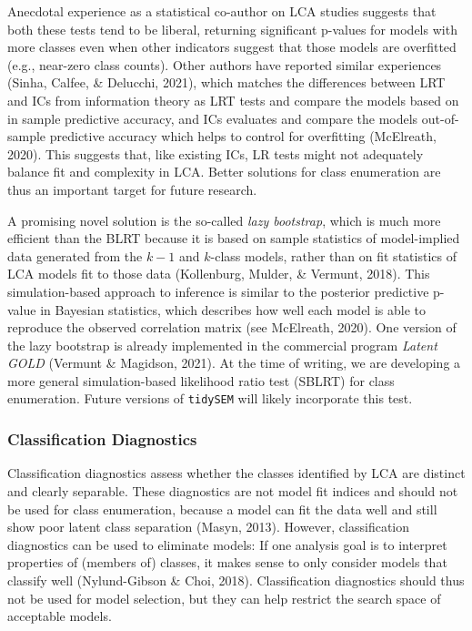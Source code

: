 \documentclass[
  ,man,floatsintext]{apa6}
\begin{document}
Anecdotal experience as a statistical co-author on LCA studies suggests that both these tests tend to be liberal,
returning significant p-values for models with more classes even when other indicators suggest that those models are overfitted (e.g., near-zero class counts).
Other authors have reported similar experiences (Sinha, Calfee, \& Delucchi, 2021), which matches the differences between LRT and ICs from information theory as LRT tests and compare the models based on in sample predictive accuracy, and ICs evaluates and compare the models out-of-sample predictive accuracy which helps to control for overfitting (McElreath, 2020).
This suggests that, like existing ICs,
LR tests might not adequately balance fit and complexity in LCA.
Better solutions for class enumeration are thus an important target for future research.

A promising novel solution is the so-called \emph{lazy bootstrap},
which is much more efficient than the BLRT because it is based on sample statistics of model-implied data generated from the \(k-1\) and \(k\)-class models,
rather than on fit statistics of LCA models fit to those data (Kollenburg, Mulder, \& Vermunt, 2018).
This simulation-based approach to inference is similar to the posterior predictive p-value in Bayesian statistics,
which describes how well each model is able to reproduce the observed correlation matrix (see McElreath, 2020).
One version of the lazy bootstrap is already implemented in the commercial program \emph{Latent GOLD} (Vermunt \& Magidson, 2021).
At the time of writing, we are developing a more general simulation-based likelihood ratio test (SBLRT) for class enumeration.
Future versions of \texttt{tidySEM} will likely incorporate this test.

\hypertarget{classification-diagnostics}{%
\subsubsection{Classification Diagnostics}\label{classification-diagnostics}}

Classification diagnostics assess whether the classes identified by LCA are distinct and clearly separable.
These diagnostics are not model fit indices and should not be used for class enumeration,
because a model can fit the data well and still show poor latent class separation (Masyn, 2013).
However, classification diagnostics can be used to eliminate models:
If one analysis goal is to interpret properties of (members of) classes,
it makes sense to only consider models that classify well (Nylund-Gibson \& Choi, 2018).
Classification diagnostics should thus not be used for model selection, but they can help restrict the search space of acceptable models.
\end{document}
